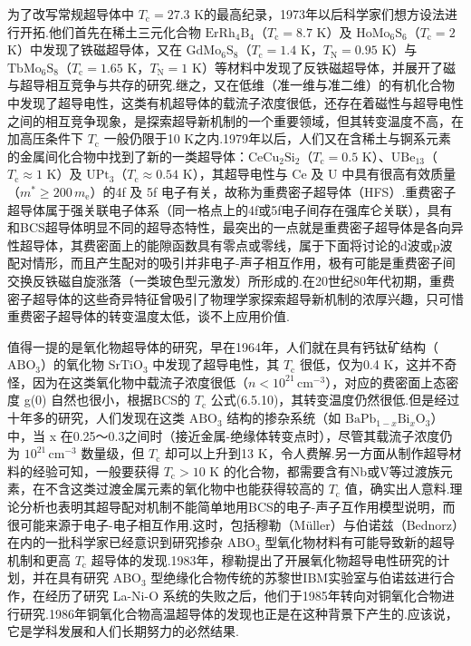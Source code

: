 为了改写常规超导体中 $T_{\mathrm{c}}=27.3$ K的最高纪录，1973年以后科学家们想方设法进行开拓.他们首先在稀土三元化合物 $\mathrm{ErRh}_{4}\mathrm{B}_{4}$（$T_{\mathrm{c}}=8.7$ K）及 $\mathrm{HoMo}_{6}\mathrm{S}_{6}$（$T_{\mathrm{c}}=2$ K）中发现了铁磁超导体，又在 $\mathrm{GdMo}_{6}\mathrm{S}_{8}$（$T_{\mathrm{c}}=1.4$ K，$T_{\mathrm{N}}=0.95$ K）与 $\mathrm{TbMo}_{6}\mathrm{S}_{8}$（$T_{\mathrm{c}}=1.65$ K，$T_{\mathrm{N}}=1$ K）等材料中发现了反铁磁超导体，并展开了磁与超导相互竞争与共存的研究.继之，又在低维（准一维与准二维）的有机化合物中发现了超导电性，这类有机超导体的载流子浓度很低，还存在着磁性与超导电性之间的相互竞争现象，是探索超导新机制的一个重要领域，但其转变温度不高，在加高压条件下 $T_{\mathrm{c}}$ 一般仍限于10 K之内.1979年以后，人们又在含稀土与锕系元素的金属间化合物中找到了新的一类超导体：$\mathrm{CeCu}_{2}\mathrm{Si}_{2}$（$T_{\mathrm{c}}=0.5$ K）、$\mathrm{UBe}_{13}$（$T_{\mathrm{c}}\approx1$ K）及 $\mathrm{UPt}_{3}$（$T_{\mathrm{c}}\approx0.54$ K），其超导电性与 Ce 及 U 中具有很高有效质量（$m^{*}\geqslant200\,m_{\mathrm{e}}$）的4f 及 5f 电子有关，故称为重费密子超导体（HFS）.重费密子超导体属于强关联电子体系（同一格点上的4f或5f电子间存在强库仑关联），具有和BCS超导体明显不同的超导态特性，最突出的一点就是重费密子超导体是各向异性超导体，其费密面上的能隙函数具有零点或零线，属于下面将讨论的d波或p波配对情形，而且产生配对的吸引并非电子-声子相互作用，极有可能是重费密子间交换反铁磁自旋涨落（一类玻色型元激发）所形成的.在20世纪80年代初期，重费密子超导体的这些奇异特征曾吸引了物理学家探索超导新机制的浓厚兴趣，只可惜重费密子超导体的转变温度太低，谈不上应用价值.

值得一提的是氧化物超导体的研究，早在1964年，人们就在具有钙钛矿结构（$\mathrm{ABO}_{3}$）的氧化物 $\mathrm{SrTiO}_{3}$ 中发现了超导电性，其 $T_{\mathrm{c}}$ 很低，仅为0.4 K，这并不奇怪，因为在这类氧化物中载流子浓度很低（$n<10^{21}\,\mathrm{cm}^{-3}$），对应的费密面上态密度 g(0) 自然也很小，根据BCS的 $T_{\mathrm{c}}$ 公式(6.5.10)，其转变温度仍然很低.但是经过十年多的研究，人们发现在这类 $\mathrm{ABO}_{3}$ 结构的掺杂系统（如 $\mathrm{BaPb}_{1-x}\mathrm{Bi}_{x}\mathrm{O}_{3}$）中，当 x 在0.25～0.3之间时（接近金属-绝缘体转变点时），尽管其载流子浓度仍为 $10^{21}\,\mathrm{cm}^{-3}$ 数量级，但 $T_{\mathrm{c}}$ 却可以上升到13 K，令人费解.另一方面从制作超导材料的经验可知，一般要获得 $T_{\mathrm{c}}>10$ K 的化合物，都需要含有Nb或V等过渡族元素，在不含这类过渡金属元素的氧化物中也能获得较高的 $T_{\mathrm{c}}$ 值，确实出人意料.理论分析也表明其超导配对机制不能简单地用BCS的电子-声子互作用模型说明，而很可能来源于电子-电子相互作用.这时，包括穆勒（Müller）与伯诺兹（Bednorz）在内的一批科学家已经意识到研究掺杂 $\mathrm{ABO}_{3}$ 型氧化物材料有可能导致新的超导机制和更高 $T_{\mathrm{c}}$ 超导体的发现.1983年，穆勒提出了开展氧化物超导电性研究的计划，并在具有研究 $\mathrm{ABO}_{3}$ 型绝缘化合物传统的苏黎世IBM实验室与伯诺兹进行合作，在经历了研究 La-Ni-O 系统的失败之后，他们于1985年转向对铜氧化合物进行研究.1986年铜氧化合物高温超导体的发现也正是在这种背景下产生的.应该说，它是学科发展和人们长期努力的必然结果.

